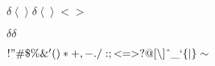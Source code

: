 \documentclass[
  ngerman,DIV=22,
  slantedgreek=true,
  cdfont=false,
  cdmath=false,
  cdgeometry=false,
]{tudscrreprt}
\providecommand*{\bm}[1]{\boldsymbol{#1}}
\providecommand*{\boldsymbol}[1]{{#1}}
\begin{document}
$\delta \left<\right> \bm{\delta \left<\right> <>}$


$\delta \bm{\delta}$

$!"\#\$\%\&'()*+,-./:;<=>?@[\backslash]\string^\_\string`\{|\}\sim$
\end{document}
